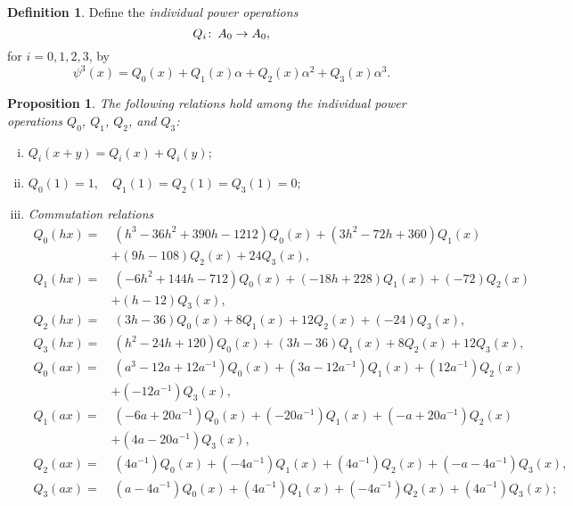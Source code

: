 \documentclass{gtpart}
\newtheorem{prop}[thm]{Proposition}
\theoremstyle{definition}
\newtheorem{defn}[thm]{Definition}
\theoremstyle{remark}
\def\co{\colon\thinspace}
\newcommand{\A}{\alpha}
\newcommand{\p}{\psi^3}
\begin{document}
\begin{defn}
\label{def:Q}
Define the {\em individual power operations} 
\[
 Q_i \co A_0 \to A_0, 
\]
for $i = 0, 1, 2, 3$, by 
\[
 \p (x) = Q_0(x) + Q_1(x) \A + Q_2(x) \A^2 + Q_3(x) \A^3.  
\]
\end{defn}

\begin{prop}
\label{prop:Q}
 The following relations hold among the individual power operations $Q_0$, $Q_1$, $Q_2$, and $Q_3$: 
 \begin{enumerate}[(i)]
  \item $Q_i(x+y) = Q_i(x) + Q_i(y);$ 

  \item $Q_0(1) = 1, \quad Q_1(1) = Q_2(1) = Q_3(1) = 0;$ 

  \item Commutation relations 
  \begin{equation*}
  \begin{split}
   Q_0(h x) = & ~ (h^3 - 36 h^2 + 390 h - 1212) Q_0(x) + (3 h^2 - 72 h + 360) Q_1(x) \qquad \qquad \\
              & + (9 h - 108) Q_2(x) + 24 Q_3(x), \\
   Q_1(h x) = & ~ (-6 h^2 + 144 h - 712) Q_0(x) + (-18 h + 228) Q_1(x) + (-72) Q_2(x) \\
              & + (h - 12) Q_3(x), \\
   Q_2(h x) = & ~ (3 h - 36) Q_0(x) + 8 Q_1(x) + 12 Q_2(x) + (-24) Q_3(x), \\
   Q_3(h x) = & ~ (h^2 - 24 h + 120) Q_0(x) + (3 h - 36) Q_1(x) + 8 Q_2(x) + 12 Q_3(x), \\
   Q_0(a x) = & ~ (a^3 - 12 a + 12 a^{-1}) Q_0(x) + (3 a - 12 a^{-1}) Q_1(x) + (12 a^{-1}) Q_2(x) \\
              & + (-12 a^{-1}) Q_3(x), \\
   Q_1(a x) = & ~ (-6 a + 20 a^{-1}) Q_0(x) + (-20 a^{-1}) Q_1(x) + (- a + 20 a^{-1}) Q_2(x) \\
              & + (4 a - 20 a^{-1}) Q_3(x), \\
   Q_2(a x) = & ~ (4 a^{-1}) Q_0(x) + (-4 a^{-1}) Q_1(x) + (4 a^{-1}) Q_2(x) + (- a - 4 a^{-1}) Q_3(x), \\
   Q_3(a x) = & ~ (a - 4 a^{-1}) Q_0(x) + (4 a^{-1}) Q_1(x) + (-4 a^{-1}) Q_2(x) + (4 a^{-1}) Q_3(x); 
  \end{split}
  \end{equation*}


\end{enumerate}
\end{prop}
\end{document}

